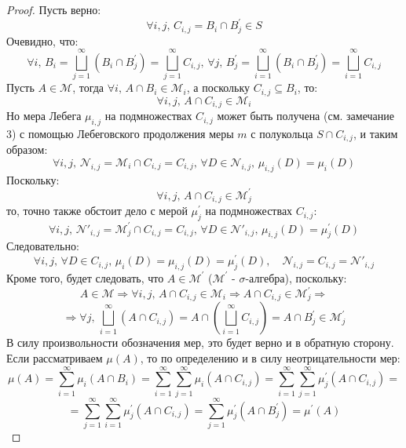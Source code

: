 \documentclass[12pt]{article}
\newcommand{\MM}{\mathcal{M}}
\newcommand{\MCN}{\mathcal{N}}
\theoremstyle{definition}
\begin{document}
\begin{proof}
	Пусть верно: 
	$$
		\forall i, j, \, C_{i,j} = B_i \cap B_j^\prime \in S
	$$ 
	Очевидно, что:  
	$$
		\forall i, \, B_i = \displaystyle \bigsqcup\limits_{j = 1}^{\infty}(B_i \cap B_j^\prime) = \bigsqcup\limits_{j = 1}^{\infty}C_{i,j}, \, \forall j, \, B_j^\prime = \displaystyle \bigsqcup\limits_{i = 1}^{\infty}(B_i \cap B_j^\prime) = \bigsqcup\limits_{i = 1}^{\infty}C_{i,j}
	$$
	Пусть $A \in \MM$, тогда $\forall i,\, A \cap B_i \in \MM_i$, а поскольку $C_{i,j} \subseteq B_i$, то: 
	$$
		\forall i, j, \, A \cap C_{i,j} \in \MM_i
	$$ 
	Но мера Лебега $\mu_{i,j}$ на подмножествах $C_{i,j}$ может быть получена (см. замечание $3$) с помощью Лебеговского продолжения меры $m$ с полукольца $S \cap C_{i,j}$, и таким образом: 
	$$
		\forall i,j, \, \MCN_{i,j} = \MM_i \cap C_{i,j} = C_{i,j}, \,  \forall D \in \MCN_{i,j}, \, \mu_{i,j}(D) = \mu_i(D)
	$$
	Поскольку:
	$$
		\forall i,j, \, A \cap C_{i,j} \in \MM_j^\prime 
	$$ 
	то, точно также обстоит дело с мерой $\mu_j^\prime $ на подмножествах $C_{i,j}$: 
	$$
			\forall i,j, \, \MCN'_{i,j} = \MM_j^\prime \cap C_{i,j} = C_{i,j}, \,  \forall D \in \MCN'_{i,j}, \, \mu_{i,j}(D) = \mu_j^\prime(D)
	$$
	Следовательно:
	$$
		\forall i,j, \, \forall D \in C_{i,j}, \, \mu_i(D) = \mu_{i,j}(D) = \mu_j^\prime(D), \quad \MCN_{i,j}  =C_{i,j} = \MCN'_{i,j}
	$$
	Кроме того, будет следовать, что $A \in \MM^\prime$ ($\MM^\prime$ - $\sigma$-алгебра), поскольку:
	$$
		A \in \MM \Rightarrow \forall i, j, \, A \cap C_{i,j} \in \MM_i \Rightarrow A \cap C_{i,j} \in \MM_j^\prime \Rightarrow  
	$$
	$$	
		\Rightarrow \forall j,\, \bigsqcup\limits_{i = 1}^{\infty} \left(A \cap C_{i,j}\right) = A \cap \left(\bigsqcup\limits_{i = 1}^{\infty}C_{i,j}\right) = A \cap B_j^\prime \in \MM_j^\prime
	$$
	В силу произвольности обозначения мер, это будет верно и в обратную сторону. Если рассматриваем $\mu(A)$, то по определению и в силу неотрицательности мер:
	$$
		\mu(A) = \sum\limits_{i = 1}^{\infty}\mu_i(A \cap B_i) = \sum\limits_{i = 1}^{\infty}\sum\limits_{j = 1}^{\infty}\mu_i(A \cap C_{i,j}) = \sum\limits_{i = 1}^{\infty}\sum\limits_{j = 1}^{\infty}\mu_j^\prime(A \cap C_{i,j}) =  
	$$
	$$
		= \sum\limits_{j = 1}^{\infty}\sum\limits_{i = 1}^{\infty}\mu_j^\prime(A \cap C_{i,j}) = \sum\limits_{j = 1}^{\infty}\mu_j^\prime(A \cap B_j^\prime) = \mu^\prime(A)
	$$

\end{proof}
\end{document}
